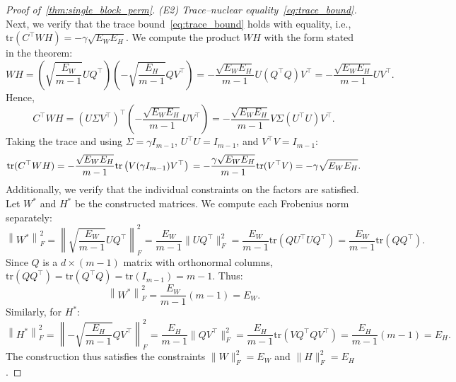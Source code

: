 \documentclass[11pt]{article}
\begin{document}
\begin{proof}[Proof of~\cref{thm:single_block_perm}]
\noindent\textit{(E2) Trace--nuclear equality~\cref{eq:trace_bound}.} 
Next, we verify that the trace bound~\cref{eq:trace_bound} holds with equality, i.e., \(\mathrm{tr}(C^\top WH) = -\gamma \sqrt{E_W E_H}\). We compute the product \(WH\) with the form stated in the theorem:
\[
WH 
= \left(\sqrt{ \frac{E_W}{m-1}} UQ^\top\right)
  \left(-\sqrt{ \frac{E_H}{m-1}} QV^\top\right)
= -\frac{\sqrt{E_W E_H}}{m-1} U (Q^\top Q) V^\top
= -\frac{\sqrt{E_W E_H}}{m-1} U V^\top.
\]
Hence,
\[
C^\top WH
= (U \Sigma V^\top)^\top \left(- \frac{\sqrt{E_W E_H}}{m-1} U V^\top\right)
= -\frac{\sqrt{E_W E_H}}{m-1} V \Sigma (U^\top U) V^\top.
\]
Taking the trace and using \(\Sigma=\gamma I_{m-1}\), \(U^\top U=I_{m-1}\), and \(V^\top V=I_{m-1}\):
\[
\mathrm{tr}(C^\top WH)
= -\frac{\sqrt{E_W E_H}}{m-1} \mathrm{tr} \left(V (\gamma I_{m-1}) V^\top\right) \\
= -\frac{\gamma \sqrt{E_W E_H}}{m-1} \mathrm{tr} (V^\top V) \\
= -\gamma \sqrt{E_W E_H}.
\]
Additionally, we verify that the individual constraints on the factors are satisfied. Let \(W^*\) and \(H^*\) be the constructed matrices. We compute each Frobenius norm separately:
\[
\left\|W^*\right\|_F^2 = \left\| \sqrt{\frac{E_W}{m-1}} U Q^\top \right\|_F^2 = \frac{E_W}{m-1} \|UQ^\top\|_F^2 = \frac{E_W}{m-1} \mathrm{tr}\left(Q U^\top U Q^\top\right) = \frac{E_W}{m-1} \mathrm{tr}(Q Q^\top).
\]
Since \(Q\) is a \(d \times (m-1)\) matrix with orthonormal columns, \(\mathrm{tr}(QQ^\top) = \mathrm{tr}(Q^\top Q) = \mathrm{tr}(I_{m-1}) = m-1\). Thus:
\[
\left\|W^*\right\|_F^2 = \frac{E_W}{m-1} (m-1) = E_W.
\]
Similarly, for \(H^*\):
\[
\left\|H^*\right\|_F^2 = \left\| -\sqrt{\frac{E_H}{m-1}} Q V^\top \right\|_F^2 = \frac{E_H}{m-1} \|QV^\top\|_F^2 = \frac{E_H}{m-1} \mathrm{tr}(V Q^\top Q V^\top) = \frac{E_H}{m-1} (m-1) = E_H.
\]
The construction thus satisfies the constraints \(\|W\|_F^2 = E_W\) and \(\|H\|_F^2 = E_H\). 

\medskip


\end{proof}
\end{document}
